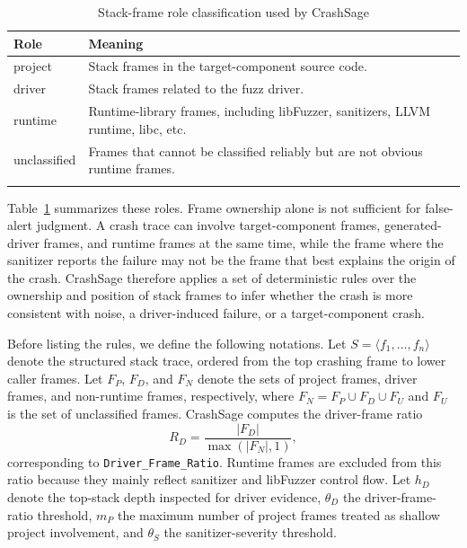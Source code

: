 \documentclass[pdflatex,sn-basic]{sn-jnl}%
\renewcommand{\arraystretch}{1.16}%
\theoremstyle{thmstyleone}%
\theoremstyle{thmstyletwo}%
\theoremstyle{thmstylethree}%
\begin{document}
\begin{table}[!htbp]
\caption{Stack-frame role classification used by CrashSage}
\label{tab:stack-frame-roles}
\centering
\scriptsize
\setlength{\tabcolsep}{4.0pt}
\renewcommand{\arraystretch}{1.10}
\begin{tabular*}{\linewidth}{@{\extracolsep{\fill}}ll}
\toprule
Role & Meaning \\
\midrule
project & Stack frames in the target-component source code. \\
driver & Stack frames related to the fuzz driver. \\
runtime & Runtime-library frames, including libFuzzer, sanitizers, LLVM runtime, libc, etc. \\
unclassified & Frames that cannot be classified reliably but are not obvious runtime frames. \\
\botrule
\end{tabular*}
\end{table}
\FloatBarrier

Table~\ref{tab:stack-frame-roles} summarizes these roles. Frame ownership alone is not sufficient for false-alert judgment.
A crash trace can involve target-component frames, generated-driver frames, and runtime frames at the same time, while the frame where the sanitizer reports the failure may not be the frame that best explains the origin of the crash.
CrashSage therefore applies a set of deterministic rules over the ownership and position of stack frames to infer whether the crash is more consistent with noise, a driver-induced failure, or a target-component crash.

Before listing the rules, we define the following notations.
Let \(S=\langle f_1,\ldots,f_n\rangle\) denote the structured stack trace, ordered from the top crashing frame to lower caller frames.
Let \(F_P\), \(F_D\), and \(F_N\) denote the sets of project frames, driver frames, and non-runtime frames, respectively, where \(F_N=F_P\cup F_D\cup F_U\) and \(F_U\) is the set of unclassified frames.
CrashSage computes the driver-frame ratio
\begin{equation*}
R_D=\frac{|F_D|}{\max(|F_N|,1)} ,
\end{equation*}
corresponding to \texttt{Driver\_Frame\_Ratio}.
Runtime frames are excluded from this ratio because they mainly reflect sanitizer and libFuzzer control flow.
Let \(h_D\) denote the top-stack depth inspected for driver evidence, \(\theta_D\) the driver-frame-ratio threshold, \(m_P\) the maximum number of project frames treated as shallow project involvement, and \(\theta_S\) the sanitizer-severity threshold.
\end{document}
